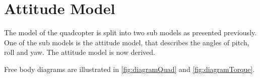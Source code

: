 \section{Attitude Model}
The model of the quadcopter is split into two sub models as presented previously. One of the sub models is the attitude model, that describes the angles of pitch, roll and yaw. The attitude model is now derived.


Free body diagrams are illustrated in \autoref{fig:diagramQuad} and \autoref{fig:diagramTorque}. 

%
%

